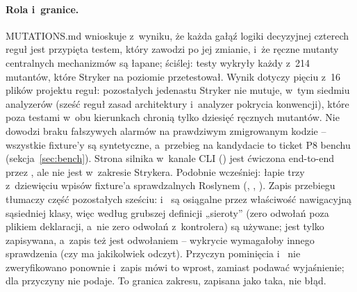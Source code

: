 \paragraph{Rola i~granice.} MUTATIONS.md wnioskuje z~wyniku, że każda gałąź logiki
decyzyjnej czterech reguł jest przypięta testem, który zawodzi po jej zmianie, i~że ręczne
mutanty centralnych mechanizmów są łapane; ściślej: testy wykryły każdy z~214 mutantów,
które Stryker na poziomie  przetestował. Wynik dotyczy pięciu z~16 plików projektu reguł: pozostałych jedenastu
Stryker nie mutuje, w~tym siedmiu analyzerów (sześć reguł zasad architektury i~analyzer
pokrycia konwencji), które poza testami w~obu kierunkach chronią tylko dziesięć ręcznych
mutantów. Nie dowodzi braku fałszywych alarmów na prawdziwym zmigrowanym kodzie
-- wszystkie fixture'y są syntetyczne, a~przebieg na kandydacie to ticket P8 benchu
(sekcja~\ref{sec:bench}). Strona silnika w~kanale CLI ()
jest ćwiczona end-to-end przez , ale nie jest w~zakresie
Strykera. Podobnie wcześniej:  łapie trzy z~dziewięciu
wpisów fixture'a sprawdzalnych Roslynem (, ,
). Zapis przebiegu tłumaczy część pozostałych sześciu:
 i~ są osiągalne przez właściwość nawigacyjną
sąsiedniej klasy, więc według grubszej definicji „sieroty” (zero odwołań poza plikiem
deklaracji, a~nie zero odwołań z~kontrolera) są używane;  jest tylko
zapisywana, a~zapis też jest odwołaniem -- wykrycie wymagałoby innego sprawdzenia (czy
 ma jakikolwiek odczyt). Przyczyn pominięcia 
i~ nie zweryfikowano ponownie i~zapis mówi to wprost, zamiast podawać
wyjaśnienie; dla  przyczyny nie podaje. To granica zakresu, zapisana
jako taka, nie błąd.



